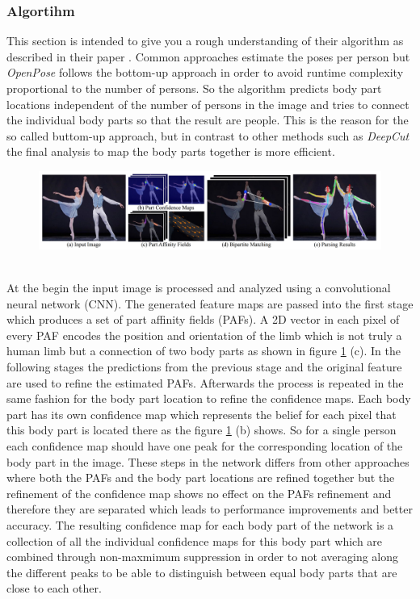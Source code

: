 \subsubsection{Algortihm}
This section is intended to give you a rough understanding of their algorithm as described in their paper \cite{openpose_paper}. Common approaches estimate the poses per person but \textit{OpenPose} follows the bottom-up approach in order to avoid runtime complexity proportional to the number of persons. So the algorithm predicts body part locations independent of the number of persons in the image and tries to connect the individual body parts so that the result are people. This is the reason for the so called buttom-up approach, but in contrast to other methods such as \textit{DeepCut}\cite{deepcut} the final analysis to map the body parts together is more efficient. 
\begin{figure}[h]
	\centering
	\includegraphics[width=1.\textwidth]{./images/openpose_overview.jpg}
	\label{fig:openpose_overview}
\end{figure}\\
At the begin the input image is processed and analyzed using a convolutional neural network (CNN). The generated feature maps are passed into the first stage which produces a set of part affinity fields (PAFs). A 2D vector in each pixel of every PAF encodes the position and orientation of the limb which is not truly a human limb but a connection of two body parts as shown in figure \ref{fig:openpose_overview} (c). In the following stages the predictions from the previous stage and the original feature are used to refine the estimated PAFs. Afterwards the process is repeated in the same fashion for the body part location to refine the confidence maps. Each body part has its own confidence map which represents the belief for each pixel that this body part is located there as the figure \ref{fig:openpose_overview} (b) shows. So for a single person each confidence map should have one peak for the corresponding location of the body part in the image. These steps in the network differs from other approaches where both the PAFs and the body part locations are refined together but the refinement of the confidence map shows no effect on the PAFs refinement and therefore they are separated which leads to performance improvements and better accuracy. The resulting confidence map for each body part of the network is a collection of all the individual confidence maps for this body part which are combined through non-maxmimum suppression in order to not averaging along the different peaks to be able to distinguish between equal body parts that are close to each other. 
